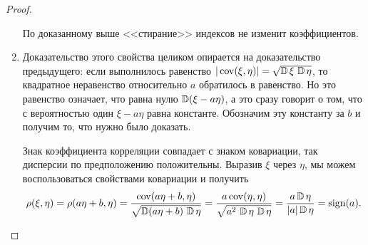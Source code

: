 \begin{proof}
\begin{enumerate}
        По доказанному выше <<стирание>> индексов не изменит коэффициентов.

    \item 
        Доказательство этого свойства целиком опирается на доказательство предыдущего: если выполнилось равенство $|\operatorname{cov}(\xi, \eta)|=\sqrt{\operatorname{\mathbb{D}} \xi \, \operatorname{\mathbb{D}} \eta}$, 
        то квадратное неравенство относительно $a$ обратилось в равенство.
        Но это равенство означает, что равна нулю $\operatorname{\mathbb{D}}(\xi - a \eta)$, а это сразу говорит о том, что с вероятностью один $\xi - a\eta$ равна константе.
        Обозначим эту константу за $b$ и получим то, что нужно было доказать.
        
        Знак коэффициента корреляции совпадает с знаком ковариации, так дисперсии по предположению положительны. Выразив $\xi$ через $\eta$, мы можем воспользоваться свойствами ковариации и получить
        \begin{equation*}
            \rho(\xi, \eta) = \rho(a\eta + b, \eta)=
            \frac{\operatorname{cov}(a\eta + b, \eta)}
            {\sqrt{\operatorname{\mathbb{D}}(a\eta + b) \, \operatorname{\mathbb{D}}\eta}} = 
            \frac{a\operatorname{cov}(\eta, \eta)}
            {\sqrt{a^2\, \operatorname{\mathbb{D}}\eta \, \operatorname{\mathbb{D}}\eta}} = 
            \frac{a\operatorname{\mathbb{D}}\eta}
            {|a|\operatorname{\mathbb{D}}\eta} = 
            \text{sign}(a).
        \end{equation*}

\end{enumerate}
\end{proof}
